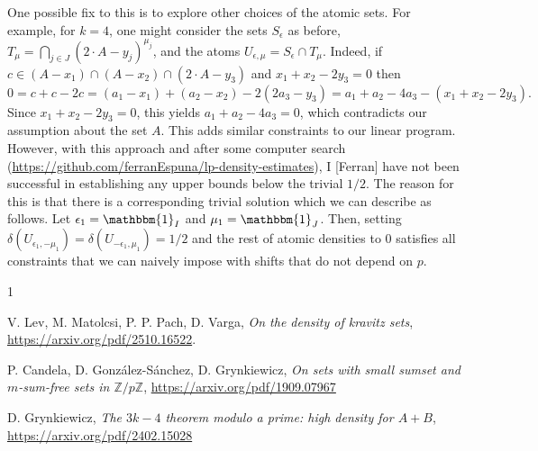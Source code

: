 \documentclass[a4paper,12pt,reqno]{amsart}
\newcommand{\1}{\mathbf{1}}
\newcommand{\0}{\mathbf{0}}
\theoremstyle{definition}
\newcommand{\mb}{\mathbb}
\begin{document}
One possible fix to this is to explore other choices of the atomic sets. For example, for $k = 4$, one might consider the sets $S_{\epsilon}$ as before, $T_{\mu} = \bigcap_{j \in J}(2 \cdot A - y_j)^{\mu_j}$, and the atoms $U_{\epsilon, \mu} = S_{\epsilon}\cap T_{\mu}$. Indeed,
if $c \in (A - x_1) \cap (A - x_2) \cap (2 \cdot A - y_3)$ and $x_1 + x_2 - 2y_3 = 0$ then
\[
    0 = c + c - 2c = (a_1 - x_1) + (a_2 - x_2) - 2(2a_3 - y_3) = a_1 + a_2 - 4a_3 - (x_1 + x_2 - 2y_3).
\]
Since $x_1 + x_2 - 2y_3 = 0$, this yields $a_1 + a_2 - 4a_3 = 0$, which contradicts our assumption about the set $A$. This adds similar constraints to our linear program. However, with this approach and after some computer search (\url{https://github.com/ferranEspuna/lp-density-estimates}), I [Ferran] have not been successful in establishing any upper bounds below the trivial $1/2$.
The reason for this is that there is a corresponding trivial solution which we can describe as follows. Let $\epsilon_1 = \mathbbm{1}_{I}$ and $\mu_{1} = \mathbbm{1}_{J}$. Then, setting $\delta(U_{\epsilon_1, -\mu_1}) = \delta(U_{-\epsilon_1, \mu_1}) = 1/2$ and the rest of atomic densities to $0$ satisfies all constraints that we can naively impose with shifts that do not depend on $p$.



\begin{thebibliography}{1}

 V. Lev, M. Matolcsi, P. P. Pach, D. Varga,   \emph{On the density of kravitz sets}, \url{https://arxiv.org/pdf/2510.16522}.

 P. Candela, D. González-Sánchez, D. Grynkiewicz, \emph{On sets with small sumset and $m$-sum-free sets in $\mb{Z}/p\mb{Z}$}, 
\url{https://arxiv.org/pdf/1909.07967}

 D. Grynkiewicz, \emph{The $3k-4$ theorem modulo a prime: high density for $A+B$}, 
\url{https://arxiv.org/pdf/2402.15028}

\end{thebibliography}
\end{document}
